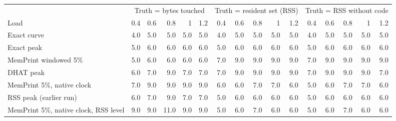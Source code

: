 \begin{tabular}{lrrrrrrrrrrrrrrr}
\toprule
 & \multicolumn{5}{c}{Truth = bytes touched} & \multicolumn{5}{c}{Truth = resident set (RSS)} & \multicolumn{5}{c}{Truth = RSS without code} \\
\cmidrule(lr){2-6} \cmidrule(lr){7-11} \cmidrule(lr){12-16}
Load & 0.4 & 0.6 & 0.8 & 1 & 1.2 & 0.4 & 0.6 & 0.8 & 1 & 1.2 & 0.4 & 0.6 & 0.8 & 1 & 1.2 \\
\midrule
Exact curve & 4.0 & 5.0 & 5.0 & 5.0 & 5.0 & 4.0 & 5.0 & 5.0 & 5.0 & 5.0 & 4.0 & 5.0 & 5.0 & 5.0 & 5.0 \\
Exact peak & 5.0 & 6.0 & 6.0 & 6.0 & 6.0 & 5.0 & 6.0 & 6.0 & 6.0 & 6.0 & 5.0 & 6.0 & 6.0 & 6.0 & 6.0 \\
MemPrint windowed 5\% & 5.0 & 6.0 & 6.0 & 6.0 & 6.0 & 7.0 & 9.0 & 9.0 & 9.0 & 9.0 & 7.0 & 9.0 & 9.0 & 9.0 & 9.0 \\
DHAT peak & 6.0 & 7.0 & 9.0 & 7.0 & 7.0 & 7.0 & 9.0 & 9.0 & 9.0 & 9.0 & 7.0 & 9.0 & 9.0 & 9.0 & 7.0 \\
MemPrint 5\%, native clock & 7.0 & 9.0 & 9.0 & 9.0 & 9.0 & 6.0 & 6.0 & 7.0 & 7.0 & 6.0 & 5.0 & 6.0 & 7.0 & 7.0 & 6.0 \\
RSS peak (earlier run) & 6.0 & 7.0 & 9.0 & 7.0 & 7.0 & 5.0 & 6.0 & 6.0 & 6.0 & 6.0 & 5.0 & 6.0 & 6.0 & 6.0 & 6.0 \\
MemPrint 5\%, native clock, RSS level & 9.0 & 9.0 & 11.0 & 9.0 & 9.0 & 5.0 & 6.0 & 7.0 & 6.0 & 6.0 & 5.0 & 6.0 & 7.0 & 6.0 & 6.0 \\
\bottomrule
\end{tabular}
